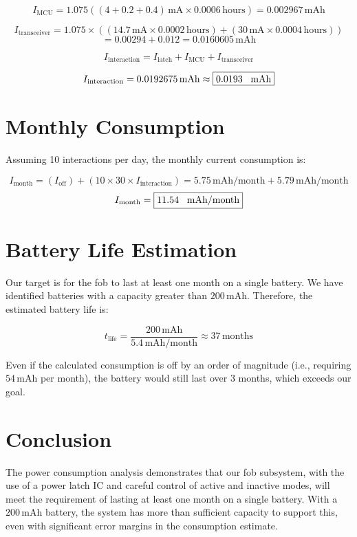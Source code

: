 \documentclass{article}
\begin{document}
\[
I_{\text{MCU}} = 1.075((4 + 0.2 + 0.4) \, \text{mA} \times 0.0006 \, \text{hours}) = 0.002967 \, \text{mAh}
\]

\[
I_{\text{transceiver}} =1.075\times((14.7 \, \text{mA} \times 0.0002 \, \text{hours}) + (30 \, \text{mA} \times 0.0004 \, \text{hours})) \]
\[
= 0.00294 + 0.012  = 0.0160605 \, \text{mAh}
\]


\[
I_{\text{interaction}} = I_{\text{latch}} + I_{\text{MCU}} + I_{\text{transceiver}}
\]

\[
I_{\text{interaction}} = 0.0192675 \, \text{mAh} \approx \fbox{0.0193 \, \text{mAh}}
\]

\section{Monthly Consumption}
Assuming 10 interactions per day, the monthly current consumption is:

\[
I_{\text{month}} = (I_{\text{off}}) +  (10 \times 30 \times I_{\text{interaction}}) =  5.75 \, \text{mAh/month} + 5.79 \, \text{mAh/month}
\]
\[
I_{\text{month}} = \fbox{11.54  \, \text{mAh/month}}
\]


\section{Battery Life Estimation}
Our target is for the fob to last at least one month on a single battery. We have identified batteries with a capacity greater than \(200 \, \text{mAh}\). Therefore, the estimated battery life is:

\[
t_{\text{life}} = \frac{200 \, \text{mAh}}{5.4 \, \text{mAh/month}} \approx 37 \, \text{months}
\]

Even if the calculated consumption is off by an order of magnitude (i.e., requiring \(54 \, \text{mAh}\) per month), the battery would still last over 3 months, which exceeds our goal.

\section{Conclusion}
The power consumption analysis demonstrates that our fob subsystem, with the use of a power latch IC and careful control of active and inactive modes, will meet the requirement of lasting at least one month on a single battery. With a \(200 \, \text{mAh}\) battery, the system has more than sufficient capacity to support this, even with significant error margins in the consumption estimate.
\end{document}
